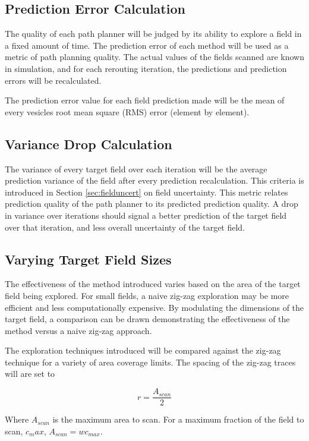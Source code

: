 \subsection{Prediction Error Calculation}
The quality of each path planner will be judged by its ability to explore a field in a fixed amount of time. The prediction error of each method will be used as a metric of path planning quality. The actual values of the fields scanned are known in simulation, and for each rerouting iteration, the predictions and prediction errors will be recalculated.

The prediction error value for each field prediction made will be the mean of every vesicles root mean square (RMS) error (element by element).

\subsection{Variance Drop Calculation}
The variance of every target field over each iteration will be the average prediction variance of the field after every prediction recalculation. This criteria is introduced in Section \ref{sec:fielduncert} on field uncertainty. This metric relates prediction quality of the path planner to its predicted prediction quality. A drop in variance over iterations should signal a better prediction of the target field over that iteration, and less overall uncertainty of the target field.

\subsection{Varying Target Field Sizes}
The effectiveness of the method introduced varies based on the area of the target field being explored. For small fields, a naive zig-zag exploration may be more efficient and less computationally expensive. By modulating the dimensions of the target field, a comparison can be drawn demonstrating the effectiveness of the method versus a naive zig-zag approach.

The exploration techniques introduced will be compared against the zig-zag technique for a variety of area coverage limits. The spacing of the zig-zag traces will are set to

\begin{equation}
	r = \frac{A_{scan}}{2}
\end{equation}

Where $A_{scan}$ is the maximum area to scan. For a maximum fraction of the field to scan, $c_max$, $A_{scan} = wc_{max}$.

